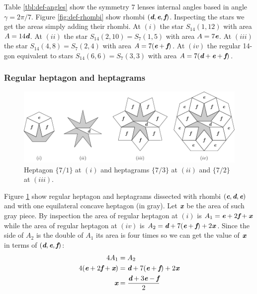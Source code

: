 \documentclass[11pt]{article}
\def\mathbi#1{\textbf{\em #1}}
\begin{document}
Table \ref{tbl:def-angles} show the symmetry 7 lenses internal angles based in angle $\gamma = 2\pi/7$.
Figure \ref{fig:def-rhombi} show rhombi $(\mathbi{d},\mathbi{e},\mathbi{f})$. 
Inspecting the stars we get the areas simply adding their rhombi.
At $(i)$ the star $S_{14}(1,12)$ with area $A = 14\mathbi{d}$. 
At $(ii)$ the star $S_{14}(2,10) = S_7(1,5)$ with area $A = 7\mathbi{e}$.
At $(iii)$ the star $S_{14}(4,8) = S_7(2,4)$ with area $A = 7(\mathbi{e} + \mathbi{f})$.
At $(iv)$ the regular 14-gon equivalent to stars $S_{14}(6,6) = S_7(3,3)$ with area $A = 7(\mathbi{d} + \mathbi{e} + \mathbi{f})$.

\subsubsection{Regular heptagon and heptagrams}

\begin{figure}[H]
\centering
\includegraphics[scale=1.1]{def/hepta}
\caption{Heptagon $\{7/1\}$ at $(i)$ and heptagrams $\{7/3\}$ at $(ii)$ and $\{7/2\}$ at $(iii)$.}
\label{fig:def-hepta}
\end{figure}

Figure \ref{fig:def-hepta} show regular heptagon and heptagrams dissected with rhombi $(\mathbi{c},\mathbi{d},\mathbi{e})$ and with one equilateral concave heptagon (in gray). Let $\mathbi{x}$ be the area of such gray piece. By inspection the area of regular heptagon at $(i)$ is $A_1 = \mathbi{e} + 2\mathbi{f} + \mathbi{x}$ while the area of regular heptagon at $(iv)$ is $A_2 = \mathbi{d} + 7(\mathbi{e}+\mathbi{f}) + 2\mathbi{x}$. Since the side of $A_2$ is the double of $A_1$ its area is four times so we can get the value of $\mathbi{x}$ in terms of $(\mathbi{d},\mathbi{e},\mathbi{f})$:
\begin{align}
4A_1 &= A_2 \nonumber\\
4(\mathbi{e} + 2\mathbi{f} + \mathbi{x}) &= \mathbi{d} + 7(\mathbi{e}+\mathbi{f}) + 2\mathbi{x} \nonumber\\
\mathbi{x} &= \frac{\mathbi{d} + 3\mathbi{e} - \mathbi{f}}2
\end{align}
\end{document}

